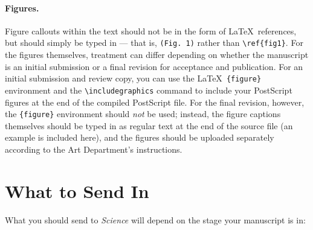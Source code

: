 \documentclass[12pt]{article}
\theoremstyle{plain}
\theoremstyle{definition}
\theoremstyle{remark}
\begin{document}
\paragraph*{Figures.}  Figure callouts within the text should not be
in the form of \LaTeX\ references, but should simply be typed in ---
that is, \verb+(Fig. 1)+ rather than \verb+\ref{fig1}+.  For the
figures themselves, treatment can differ depending on whether the
manuscript is an initial submission or a final revision for acceptance
and publication.  For an initial submission and review copy, you can
use the \LaTeX\ \verb+{figure}+ environment and the
\verb+\includegraphics+ command to include your PostScript figures at
the end of the compiled PostScript file.  For the final revision,
however, the \verb+{figure}+ environment should {\it not\/} be used;
instead, the figure captions themselves should be typed in as regular
text at the end of the source file (an example is included here), and
the figures should be uploaded separately according to the Art
Department's instructions.


\section*{What to Send In}

What you should send to {\it Science\/} will depend on the stage your manuscript is in:
\end{document}
